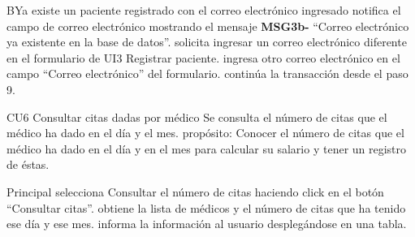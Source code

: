 \begin{UCtrayectoriaA}{B}{Ya existe un paciente registrado con el correo electrónico ingresado}
	\UCpaso notifica el campo de correo electrónico mostrando el mensaje {\bf MSG3b-}  ``Correo electrónico ya existente en la base de datos''.
	\UCpaso solicita ingresar un correo electrónico diferente en el formulario de UI3 Registrar paciente.
	\UCpaso[\UCactor] ingresa otro correo electrónico en el campo ``Correo electrónico'' del formulario.
	\UCpaso continúa la transacción desde el paso 9.
\end{UCtrayectoriaA}
	\begin{UseCase}{CU6}{ Consultar citas dadas por médico  
}{Se consulta el número de citas que el médico ha dado en el día y el mes. 
propósito: Conocer el número de citas que el médico ha dado en el día y en el mes para calcular su salario y tener un registro de éstas.}

	\end{UseCase}
\begin{UCtrayectoria}{Principal}
	\UCpaso[\UCactor] selecciona Consultar el número de citas haciendo click en el botón ``Consultar citas''.
	\UCpaso obtiene la lista de médicos y el número de citas que ha tenido ese día y ese mes.
	\UCpaso informa la información al usuario desplegándose en una tabla.
\end{UCtrayectoria}

